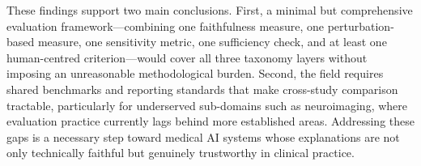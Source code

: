 These findings support two main conclusions. First, a minimal but
comprehensive evaluation framework---combining one faithfulness measure, one
perturbation-based measure, one sensitivity metric, one sufficiency check,
and at least one human-centred criterion---would cover all three taxonomy
layers without imposing an unreasonable methodological burden. Second, the
field requires shared benchmarks and reporting standards that make
cross-study comparison tractable, particularly for underserved sub-domains
such as neuroimaging, where evaluation practice currently lags behind more
established areas. Addressing these gaps is a necessary step toward medical
AI systems whose explanations are not only technically faithful but genuinely
trustworthy in clinical practice.

\newpage
